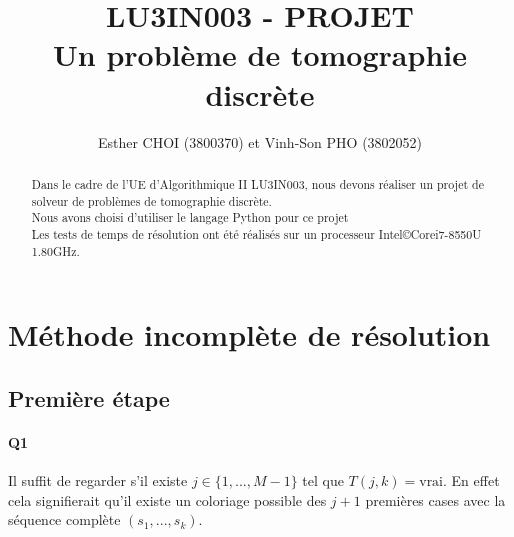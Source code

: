 \documentclass[12pt]{article}
\title{LU3IN003 - PROJET \\ Un problème de tomographie discrète\\}
\author{Esther CHOI (3800370) et Vinh-Son PHO (3802052)}
\newcommand{\true}{\text{vrai}}
\begin{document}
	\maketitle
	\tableofcontents
	
	
	\begin{abstract}
		Dans le cadre de l'UE d'Algorithmique II LU3IN003, nous devons réaliser un projet de solveur de problèmes de tomographie discrète. \\
		Nous avons choisi d'utiliser le langage Python pour ce projet \\
		Les tests de temps de résolution ont été réalisés sur un processeur Intel\copyright Core\texttrademark i7-8550U 1.80GHz.
	\end{abstract}
	
	
	\newpage
	
	
	\section{Méthode incomplète de résolution}
	
		\subsection{Première étape}
		
			\paragraph{Q1}
				Il suffit de regarder s'il existe $ j \in \{1,...,M-1\} $ tel que $ T(j,k) = \true $. En effet cela signifierait qu'il existe un coloriage possible des $ j+1 $ premières cases avec la séquence complète $ (s_1,...,s_k) $.
		
\end{document}
